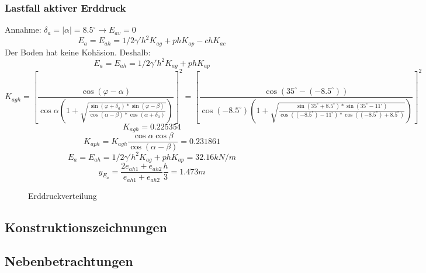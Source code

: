 \documentclass[11pt,fleqn,a4paper]{article}
\begin{document}
\subsubsection*{Lastfall aktiver Erddruck}
Annahme: $\delta_a = |\alpha| = 8.5^\circ \rightarrow E_{av} = 0 $ \cite[S.149]{wsp}
\begin{equation*}
E_a = E_{ah} =  1/2 \gamma ' h^2 K_{ag} + p h K_{ap} - c h K_{ac}
\end{equation*}
Der Boden hat keine Kohäsion. Deshalb:
\begin{equation*}
E_a = E_{ah} =  1/2 \gamma ' h^2 K_{ag} + p h K_{ap}
\end{equation*}
\begin{equation*}
K_{agh} = \left[\frac{\cos(\varphi - \alpha)}{\cos \alpha \left(1+ \sqrt{\frac{\sin(\varphi + \delta_a)*\sin(\varphi - \beta)}{\cos(\alpha - \beta) * \cos(\alpha + \delta_a)}}\right)}\right]^2
=
\left[\frac{\cos(35^\circ - (-8.5^\circ))}{\cos (-8.5^\circ) \left(1+ \sqrt{\frac{\sin(35^\circ + 8.5^\circ)*\sin(35^\circ - 11^\circ)}{\cos((-8.5^\circ) - 11^\circ) * \cos((-8.5^\circ) + 8.5^\circ)}}\right)}\right]^2 
\end{equation*}
\begin{equation*}
K_{agh} = 0.225354
\end{equation*}
\begin{equation*}
K_{aph} = K_{agh}\frac{\cos\alpha \cos\beta}{\cos(\alpha - \beta)} = 0.231861
\end{equation*}
\begin{equation*}
E_a = E_{ah} =  1/2 \gamma ' h^2 K_{ag} + p h K_{ap} = 32.16kN/m
\end{equation*}
\begin{equation*}
y_{E_a} = \frac{2e_{ah1} + e_{ah2}}{e_{ah1} + e_{ah2}} \frac{h}{3} = 1.473m
\end{equation*}

\begin{figure}
\vspace{10cm}
\caption{Erddruckverteilung}
\end{figure}
\newpage 
\subsection{Konstruktionszeichnungen}
\subsection{Nebenbetrachtungen}

\newpage
\listoffigures
\newpage
\end{document}
